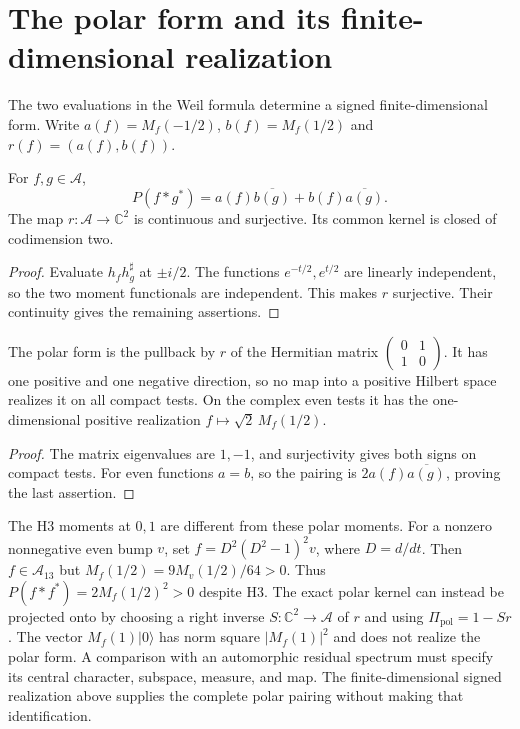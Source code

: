 \section{The polar form and its finite-dimensional realization}
\label{v4-arith:w6-b:construction-III}
\label{v4-arith:w6-b:construction-III:residual}

The two evaluations in the Weil formula determine a signed
finite-dimensional form. Write
$a(f)=M_f(-1/2)$, $b(f)=M_f(1/2)$ and $r(f)=(a(f),b(f))$.

\begin{lemma}
\label{v4-arith:w6-b:lem:residual-absorption}
For $f,g\in\mathscr A$,
\begin{equation}
\label{v4-arith:w6-b:eq:constant-mode}
 P(f*g^*)=a(f)\overline{b(g)}+b(f)\overline{a(g)}.
\end{equation}
The map $r:\mathscr A\to\mathbb C^2$ is continuous and surjective.
Its common kernel is closed of codimension two.
\end{lemma}
\begin{proof}
Evaluate $h_fh_g^\sharp$ at $\pm i/2$.
The functions $e^{-t/2},e^{t/2}$ are linearly independent, so the
two moment functionals are independent. This makes $r$ surjective.
Their continuity gives the remaining assertions.
\end{proof}

\begin{proposition}
\label{v4-arith:w6-b:prop:residual-covers-polar}
The polar form is the pullback by $r$ of the Hermitian matrix
$\left(\begin{smallmatrix}0&1\\1&0\end{smallmatrix}\right)$.
It has one positive and one negative direction, so no map into a
positive Hilbert space realizes it on all compact tests.
On the complex even tests it has the one-dimensional positive
realization $f\mapsto\sqrt2\,M_f(1/2)$.
\end{proposition}
\begin{proof}
The matrix eigenvalues are $1,-1$, and surjectivity gives both
signs on compact tests. For even functions $a=b$, so the pairing
is $2a(f)\overline{a(g)}$, proving the last assertion.
\end{proof}

\begin{remark}
\label{v4-arith:w6-b:rem:construction-III}
The H3 moments at $0,1$ are different from these polar moments.
For a nonzero nonnegative even bump $v$, set
$f=D^2(D^2-1)^2v$, where $D=d/dt$. Then $f\in\mathscr A_{13}$ but
$M_f(1/2)=9M_v(1/2)/64>0$.
Thus $P(f*f^*)=2M_f(1/2)^2>0$ despite H3.
The exact polar kernel can instead be projected onto by choosing
a right inverse $S:\mathbb C^2\to\mathscr A$ of $r$ and using
$\Pi_{\mathrm{pol}}=1-Sr$.
The vector $M_f(1)|0\rangle$ has norm square $|M_f(1)|^2$ and
does not realize the polar form. A comparison with an automorphic
residual spectrum must specify its central character, subspace,
measure, and map. The finite-dimensional signed realization above
supplies the complete polar pairing without making that identification.
\end{remark}
